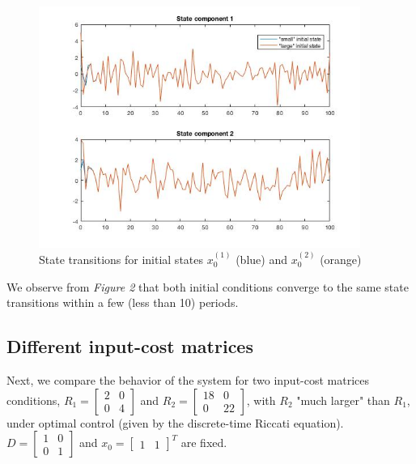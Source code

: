 \documentclass[11pt, oneside]{article}   	%
\begin{document}
\begin{figure}[ht!]
\centering
\includegraphics[width=105mm]{../plots/iii.jpg}
\caption{State transitions for initial states $x_0^{(1)}$ (blue) and $x_0^{(2)}$ (orange)}
\end{figure}   

We observe from \textit{Figure 2} that both initial conditions converge to the same state transitions within a few (less than 10) periods.

\subsection{Different input-cost matrices}
Next, we compare the behavior of the system for two input-cost matrices conditions, $R_1 = \begin{bmatrix} 2 & 0 \\[0.3em] 0 & 4 \end{bmatrix}$ and $R_2 = \begin{bmatrix} 18 & 0 \\[0.3em] 0 & 22 \end{bmatrix}$, with $R_2$ "much larger" than $R_1$, under optimal control (given by the discrete-time Riccati equation). $D = \begin{bmatrix} 1 & 0 \\[0.3em] 0 & 1\end{bmatrix}$ and $x_0 = \begin{bmatrix} 1 & 1 \end{bmatrix}^T$ are fixed. \\
\end{document}
